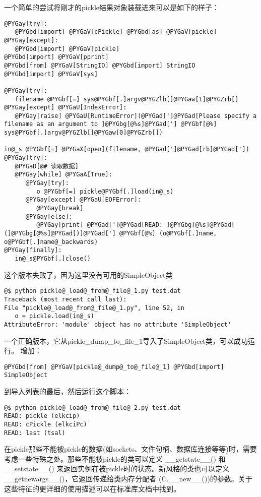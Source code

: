 \documentclass[letterpaper,10pt,english]{manual}
\begin{document}
一个简单的尝试将刚才的pickle结果对象装载进来可以是如下的样子：

\begin{Verbatim}[commandchars=@\[\]]
@PYGay[try]:
   @PYGbd[import] @PYGaV[cPickle] @PYGbd[as] @PYGaV[pickle]
@PYGay[except]:
   @PYGbd[import] @PYGaV[pickle]
@PYGbd[import] @PYGaV[pprint]
@PYGbd[from] @PYGaV[StringIO] @PYGbd[import] StringIO
@PYGbd[import] @PYGaV[sys]

@PYGay[try]:
   filename @PYGbf[=] sys@PYGbf[.]argv@PYGZlb[]@PYGaw[1]@PYGZrb[]
@PYGay[except] @PYGaU[IndexError]:
   @PYGay[raise] @PYGaU[RuntimeError](@PYGad[']@PYGad[Please specify a filename as an argument to ]@PYGbg[@%s]@PYGad['] @PYGbf[@%] sys@PYGbf[.]argv@PYGZlb[]@PYGaw[0]@PYGZrb[])

in@_s @PYGbf[=] @PYGaX[open](filename, @PYGad[']@PYGad[rb]@PYGad['])
@PYGay[try]:
   @PYGaD[@# 读取数据]
   @PYGay[while] @PYGaA[True]:
      @PYGay[try]:
         o @PYGbf[=] pickle@PYGbf[.]load(in@_s)
      @PYGay[except] @PYGaU[EOFError]:
         @PYGay[break]
      @PYGay[else]:
         @PYGay[print] @PYGad[']@PYGad[READ: ]@PYGbg[@%s]@PYGad[ (]@PYGbg[@%s]@PYGad[)]@PYGad['] @PYGbf[@%] (o@PYGbf[.]name, o@PYGbf[.]name@_backwards)
@PYGay[finally]:
   in@_s@PYGbf[.]close()
\end{Verbatim}

这个版本失败了，因为这里没有可用的SimpleObject类

\begin{Verbatim}[commandchars=@\[\]]
@$ python pickle@_load@_from@_file@_1.py test.dat
Traceback (most recent call last):
File "pickle@_load@_from@_file@_1.py", line 52, in
   o = pickle.load(in@_s)
AttributeError: 'module' object has no attribute 'SimpleObject'
\end{Verbatim}

一个正确版本，它从pickle\_dump\_to\_file\_1导入了SimpleObject类，可以成功运行。
增加：

\begin{Verbatim}[commandchars=@\[\]]
@PYGbd[from] @PYGaV[pickle@_dump@_to@_file@_1] @PYGbd[import] SimpleObject
\end{Verbatim}

到导入列表的最后，然后运行这个脚本：

\begin{Verbatim}[commandchars=@\[\]]
@$ python pickle@_load@_from@_file@_2.py test.dat
READ: pickle (elkcip)
READ: cPickle (elkciPc)
READ: last (tsal)
\end{Verbatim}

在pickle那些不能被pickle的数据(如sockets、文件句柄、数据库连接等等)时，需要考虑一些特殊之处。那些不能被pickle的类可以定义 \_\_getstate\_\_() 和 \_\_setstate\_\_() 来返回实例在被pickle时的状态。新风格的类也可以定义\_\_getnewargs\_\_()，它返回传递给类内存分配者 (C.\_\_new\_\_())的参数。关于这些特征的更详细的使用描述可以在标准库文档中找到。
\end{document}
